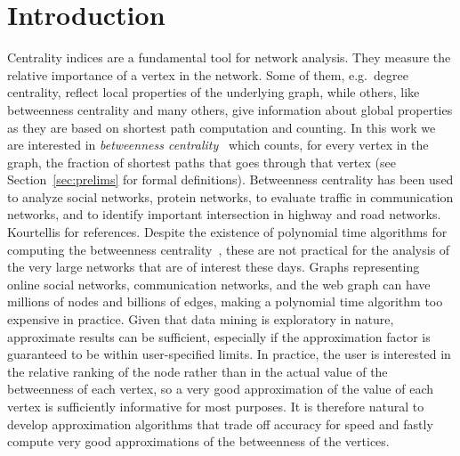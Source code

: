 \section{Introduction}\label{sec:intro}
Centrality indices are a fundamental tool for network analysis. They measure the
relative importance of a vertex in the network. Some of them, e.g.~degree
centrality, reflect local properties of the underlying graph, while others,
like betweenness centrality and many others, give information about global
properties as they are based on shortest path computation and counting. In this
work we are interested in \emph{betweenness
centrality}~\citep{Anthonisse71,Freeman77} which counts, for every vertex in the
graph, the fraction of shortest paths that goes through that vertex (see
Section~\ref{sec:prelims} for formal definitions). Betweenness centrality has
been used to analyze social networks, protein networks, to evaluate traffic in
communication networks, and to identify important intersection in highway and
road networks. \XXX Kourtellis for references. Despite the existence of
polynomial time algorithms for computing the betweenness
centrality~\citep{Brandes01}, these are not practical for the analysis of the
very large networks that are of interest these days. Graphs representing online
social networks, communication networks, and the web graph can have millions of
nodes and billions of edges, making a polynomial time algorithm too expensive in
practice. Given that data mining is exploratory in nature, approximate results
can be sufficient, especially if the approximation factor is guaranteed to be
within user-specified limits. In practice, the user is interested in the
relative ranking of the node rather than in the actual value of the betweenness
of each vertex, so a very good approximation of the value of each vertex is
sufficiently informative for most purposes. It is therefore natural to develop
approximation algorithms that trade off accuracy for speed and fastly compute
very good approximations of the betweenness of the vertices. 

